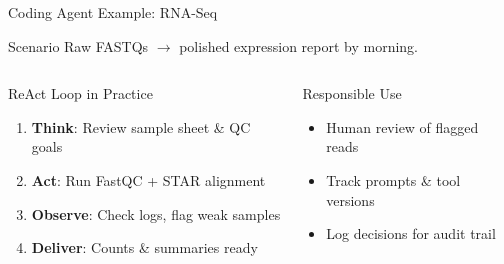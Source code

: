 \documentclass[aspectratio=169]{beamer}
\begin{document}
\begin{frame}{Coding Agent Example: RNA-Seq}
  \begin{block}{Scenario}
    Raw FASTQs $\rightarrow$ polished expression report by morning.
  \end{block}

  \vspace{0.5cm}

  \begin{columns}[T]
    \begin{column}{0.48\textwidth}
      \small
      \textcolor{conesaTeal}{ReAct Loop in Practice}

      \vspace{0.2cm}

      \begin{enumerate}
        \item \textbf{Think}: Review sample sheet \& QC goals
        \item \textbf{Act}: Run FastQC + STAR alignment
        \item \textbf{Observe}: Check logs, flag weak samples
        \item \textbf{Deliver}: Counts \& summaries ready
      \end{enumerate}
    \end{column}
    \begin{column}{0.48\textwidth}
      \small
      \textcolor{conesaOrange}{Responsible Use}

      \vspace{0.2cm}

      \begin{itemize}
        \item Human review of flagged reads
        \item Track prompts \& tool versions
        \item Log decisions for audit trail
      \end{itemize}
    \end{column}
  \end{columns}
\end{frame}
\end{document}
